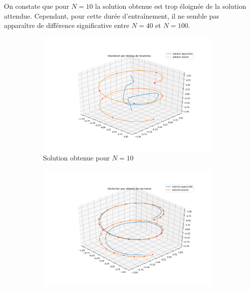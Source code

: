 \documentclass[12pt]{report}
\begin{document}
On constate que pour $N=10$ la solution obtenue est trop éloignée de la solution attendue. Cependant, pour cette durée d'entraînement, il ne semble pas apparaître de différence significative entre $N=40$ et $N=100$.

\begin{figure}
    \centering
    \begin{subfigure}[b]{0.4\textwidth}
        \centering
        \includegraphics[width=1\textwidth, height=0.9\textwidth]{direct_training_N=10.png}
        \caption{Solution obtenue pour $N=10$}
    \end{subfigure}
    \hfill
    \begin{subfigure}[b]{0.4\textwidth}
        \centering
        \includegraphics[width=1\textwidth, height=0.9\textwidth]{direct_training_N=40.png}

\end{subfigure}
\end{figure}
\end{document}

